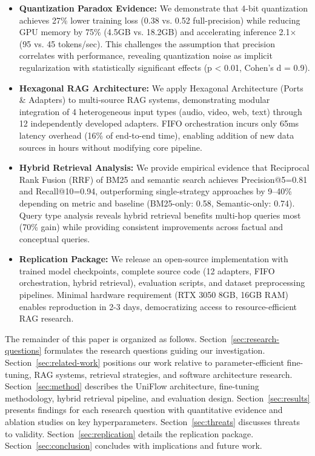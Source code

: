 \documentclass[pdflatex,sn-basic]{sn-jnl}
\begin{document}
\begin{itemize}
    \item \textbf{Quantization Paradox Evidence:} We demonstrate that 4-bit quantization achieves 27\% lower training loss (0.38 vs. 0.52 full-precision) while reducing GPU memory by 75\% (4.5GB vs. 18.2GB) and accelerating inference 2.1$\times$ (95 vs. 45 tokens/sec). This challenges the assumption that precision correlates with performance, revealing quantization noise as implicit regularization with statistically significant effects (p < 0.01, Cohen's d = 0.9).
    
    \item \textbf{Hexagonal RAG Architecture:} We apply Hexagonal Architecture (Ports \& Adapters) to multi-source RAG systems, demonstrating modular integration of 4 heterogeneous input types (audio, video, web, text) through 12 independently developed adapters. FIFO orchestration incurs only 65ms latency overhead (16\% of end-to-end time), enabling addition of new data sources in hours without modifying core pipeline.
    
    \item \textbf{Hybrid Retrieval Analysis:} We provide empirical evidence that Reciprocal Rank Fusion (RRF) of BM25 and semantic search achieves Precision@5=0.81 and Recall@10=0.94, outperforming single-strategy approaches by 9--40\% depending on metric and baseline (BM25-only: 0.58, Semantic-only: 0.74). Query type analysis reveals hybrid retrieval benefits multi-hop queries most (70\% gain) while providing consistent improvements across factual and conceptual queries.
    
    \item \textbf{Replication Package:} We release an open-source implementation with trained model checkpoints, complete source code (12 adapters, FIFO orchestration, hybrid retrieval), evaluation scripts, and dataset preprocessing pipelines. Minimal hardware requirement (RTX 3050 8GB, 16GB RAM) enables reproduction in 2-3 days, democratizing access to resource-efficient RAG research.
\end{itemize}

\noindent
The remainder of this paper is organized as follows. Section~\ref{sec:research-questions} formulates the research questions guiding our investigation. Section~\ref{sec:related-work} positions our work relative to parameter-efficient fine-tuning, RAG systems, retrieval strategies, and software architecture research. Section~\ref{sec:method} describes the UniFlow architecture, fine-tuning methodology, hybrid retrieval pipeline, and evaluation design. Section~\ref{sec:results} presents findings for each research question with quantitative evidence and ablation studies on key hyperparameters. Section~\ref{sec:threats} discusses threats to validity. Section~\ref{sec:replication} details the replication package. Section~\ref{sec:conclusion} concludes with implications and future work.
\end{document}
